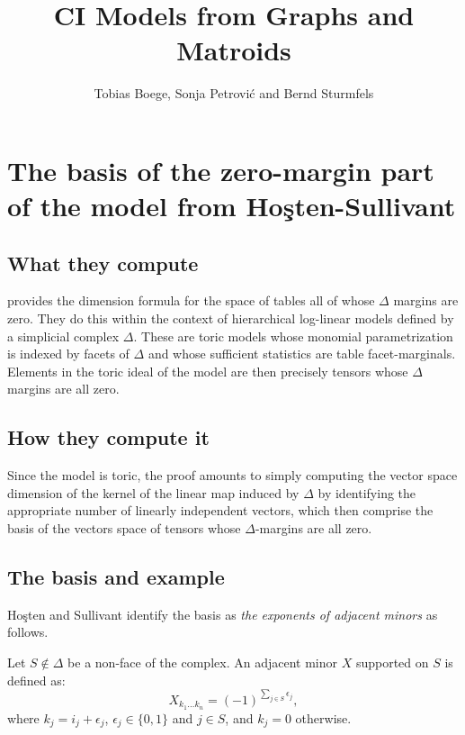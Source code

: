 \documentclass[12pt]{extarticle}
\title{\bf  CI Models from Graphs and Matroids}
\author{Tobias Boege, Sonja Petrovi\'c and Bernd Sturmfels}
\date{}
\theoremstyle{definition}
\numberwithin{theorem}{section}
\begin{document}
\maketitle




\section*{The basis of the zero-margin part of the model from Ho\c{s}ten-Sullivant} 

\subsection*{What they compute} 
\cite[Theorem 2.6]{HoSu02} provides the dimension formula for the space of tables all of whose $\Delta$ margins are zero. %
They do this within the context of hierarchical log-linear models defined by a simplicial complex $\Delta$. These are toric models whose monomial parametrization is indexed by facets of $\Delta$ and whose sufficient statistics are table facet-marginals. Elements in the toric ideal of the model are then precisely tensors whose $\Delta$ margins are all zero. 

\subsection*{How they compute it}
Since the model is toric, the proof amounts to simply computing the vector space dimension of the kernel of the linear map induced by $\Delta$ by identifying the appropriate number of linearly independent vectors, which then comprise the basis of the vectors space of tensors whose $\Delta$-margins are all zero.  

\subsection*{The basis and example} 
Ho\c{s}ten and Sullivant identify  the basis as \emph{the exponents of adjacent minors}  as follows. 

Let $S\not\in\Delta$ be a non-face of the complex. An adjacent minor $X$ supported on $S$ is defined as: 
\[
	X_{k_1\dots k_n} =(-1)^{\sum_{j\in S}\epsilon_j}, 
\]
where $k_j=i_j+\epsilon_j$, $\epsilon_j\in\{0,1\}$ and $j\in S$, and $k_j=0$ otherwise.
\end{document}
